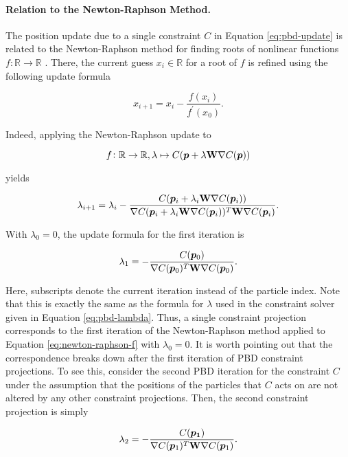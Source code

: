 \paragraph{Relation to the Newton-Raphson Method.}
The position update due to a single constraint $C$ in Equation \ref{eq:pbd-update} is related to the Newton-Raphson method for finding roots of nonlinear 
functions $f \colon \mathbb{R} \to \mathbb{R}$ \cite{mueller2006}. There, the current guess $x_i \in \mathbb{R}$ for a root of $f$ is refined 
using the following update formula 

\begin{equation}\label{eq:newton-raphson}
    x_{i+1} = x_i - \frac{f(x_i)}{f^{\prime}(x_0)}.
\end{equation}

\noindent Indeed, applying the Newton-Raphson update to 

\begin{equation}\label{eq:newton-raphson-f}
    f \colon \mathbb{R} \to \mathbb{R}, \lambda \mapsto C(\bm{p} + \lambda \mathbf{W} \nabla C(\bm{p}))
\end{equation}

\noindent yields

\[
    \lambda_{i+1} = \lambda_i - \frac{C(\bm{p}_i + \lambda_i \mathbf{W} \nabla C(\bm{p}_i))}
    {\nabla C(\bm{p}_i + \lambda_i \mathbf{W} \nabla C(\bm{p}_i))^T \mathbf{W} \nabla C(\bm{p}_i)}.
\]

\noindent With $\lambda_0 = 0$, the update formula for the first iteration is 

\[
    \lambda_1 = -\frac{C(\bm{p}_0)}{\nabla C(\bm{p}_0)^T \mathbf{W} \nabla C(\bm{p}_0)}.
\]

\noindent Here, subscripts denote the current iteration instead of the particle index. Note that this is exactly the same as the formula for 
$\lambda$ used in the constraint solver given in Equation \ref{eq:pbd-lambda}. Thus, a single 
constraint projection corresponds to the first iteration of the Newton-Raphson method applied to Equation \ref{eq:newton-raphson-f} with 
$\lambda_0 = 0$. It is worth pointing out that the correspondence breaks down after the first iteration of PBD constraint projections. To 
see this, consider the second PBD iteration for the constraint $C$ under the assumption that the positions of the particles that $C$ acts on 
are not altered by any other constraint projections. Then, the second constraint projection is simply

\[
    \lambda_2 = -\frac{C(\bm{p_1})}{\nabla C(\bm{p}_1)^T \mathbf{W} \nabla C(\bm{p}_1)}.
\]

